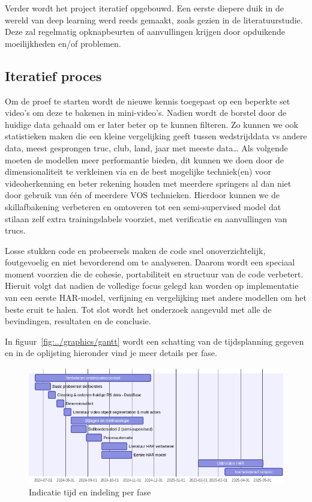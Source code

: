 Verder wordt het project iteratief opgebouwd. Een eerste diepere duik in de wereld van deep learning werd reeds gemaakt, zoals gezien in de literatuurstudie. Deze zal regelmatig opknapbeurten of aanvullingen krijgen door opduikende moeilijkheden en/of problemen.

\subsection{Iteratief proces}
Om de proef te starten wordt de nieuwe kennis toegepast op een beperkte set video's om deze te bakenen in mini-video's. Nadien wordt de borstel door de huidige data gehaald om er later beter op te kunnen filteren. Zo kunnen we ook statistieken maken die een kleine vergelijking geeft tussen wedstrijddata vs andere data, meest gesprongen truc, club, land, jaar met meeste data\dots
Als volgende moeten de modellen meer performantie bieden, dit kunnen we doen door de dimensionaliteit te verkleinen via en de best mogelijke techniek(en) voor videoherkenning en beter rekening houden met meerdere springers al dan niet door gebruik van één of meerdere VOS technieken. Hierdoor kunnen we de skillafbakening verbeteren en omtoveren tot een semi-supervised model dat stilaan zelf extra trainingslabels voorziet, met verificatie en aanvullingen van trucs.
    
Losse stukken code en probeersels maken de code snel onoverzichtelijk, foutgevoelig en niet bevorderend om te analyseren. Daarom wordt een speciaal moment voorzien die de cohesie, portabiliteit en structuur van de code verbetert. Hieruit volgt dat nadien de volledige focus gelegd kan worden op implementatie van een eerste HAR-model, verfijning en vergelijking met andere modellen om het beste eruit te halen. Tot slot wordt het onderzoek aangevuld met alle de bevindingen, resultaten en de conclusie.
    
In figuur~\ref{fig:../graphics/gantt} wordt een schatting van de tijdsplanning gegeven en in de oplijsting hieronder vind je meer details per fase.

\begin{figure}
    \centering
    \includegraphics[width=.8\columnwidth]{img/gantt}
    \caption{\label{fig:gantt}Indicatie tijd en indeling per fase}
\end{figure}

